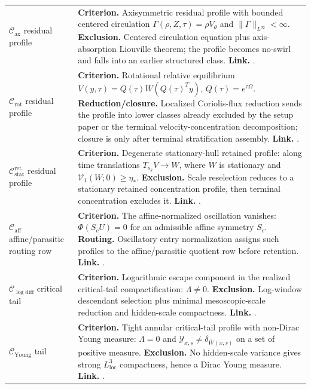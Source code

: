 \documentclass[11pt]{amsart}
\numberwithin{equation}{section}
\theoremstyle{plain}
\theoremstyle{definition}
\theoremstyle{remark}
\newcommand{\loc}{\mathrm{loc}}
\newcommand{\Vel}{\mathcal V}
\newcommand{\Cax}{\mathcal C_{\mathrm{ax}}}
\newcommand{\Crot}{\mathcal C_{\mathrm{rot}}}
\newcommand{\Cstat}{\mathcal C_{\mathrm{stat}}^{\mathrm{ret}}}
\newcommand{\Caff}{\mathcal C_{\mathrm{aff}}}
\newcommand{\Cyoung}{\mathcal C_{\mathrm{Young}}}
\newcommand{\Clogdiff}{\mathcal C_{\log\mathrm{diff}}}
\begin{document}
\begin{longtable}{@{}L{1.20in}L{4.65in}@{}}
\(\Cax\) residual profile &
\textbf{Criterion.}  Axisymmetric residual profile with bounded centered
circulation \(\Gamma(\rho,Z,\tau)=\rho V_\theta\) and
\(\|\Gamma\|_{L^\infty}<\infty\).
\textbf{Exclusion.}  Centered circulation equation plus axis-absorption
Liouville theorem; the profile becomes no-swirl and falls into an earlier
structured class.
\textbf{Link.}  .\\

\(\Crot\) residual profile &
\textbf{Criterion.}  Rotational relative equilibrium
\(V(y,\tau)=Q(\tau)W(Q(\tau)^Ty)\), \(Q(\tau)=e^{\tau\Omega}\).
\textbf{Reduction/closure.}  Localized Coriolis-flux reduction sends the profile
into lower classes already excluded by the setup paper or the terminal velocity-concentration
decomposition; closure is only after terminal stratification assembly.
\textbf{Link.}  .\\

\(\Cstat\) residual profile &
\textbf{Criterion.}  Degenerate stationary-hull retained profile: along
time translations \(T_{s_k}V\to W\), where \(W\) is stationary and
\(\Vel_1(W;0)\ge\eta_*\).
\textbf{Exclusion.}  Scale reselection reduces to a stationary retained
concentration profile, then terminal concentration excludes it.
\textbf{Link.}  .\\

\(\Caff\) affine/parasitic routing row &
\textbf{Criterion.}  The affine-normalized oscillation vanishes:
\(\Phi(S_cU)=0\) for an admissible affine symmetry \(S_c\).
\textbf{Routing.}  Oscillatory entry normalization assigns such profiles to the
affine/parasitic quotient row before retention.
\textbf{Link.}  .\\

\(\Clogdiff\) critical tail &
\textbf{Criterion.}  Logarithmic escape component in the realized
critical-tail compactification: \(\Lambda\ne0\).
\textbf{Exclusion.}  Log-window descendant selection plus minimal
mesoscopic-scale reduction and hidden-scale compactness.
\textbf{Link.}  .\\

\(\Cyoung\) tail &
\textbf{Criterion.}  Tight annular critical-tail profile with non-Dirac Young
measure: \(\Lambda=0\) and
\(\mathcal Y_{x,s}\ne\delta_{\bar W(x,s)}\) on a set of positive measure.
\textbf{Exclusion.}  No hidden-scale variance gives strong
\(L^3_{\loc}\) compactness, hence a Dirac Young measure.
\textbf{Link.}  .\\


\end{longtable}
\end{document}

